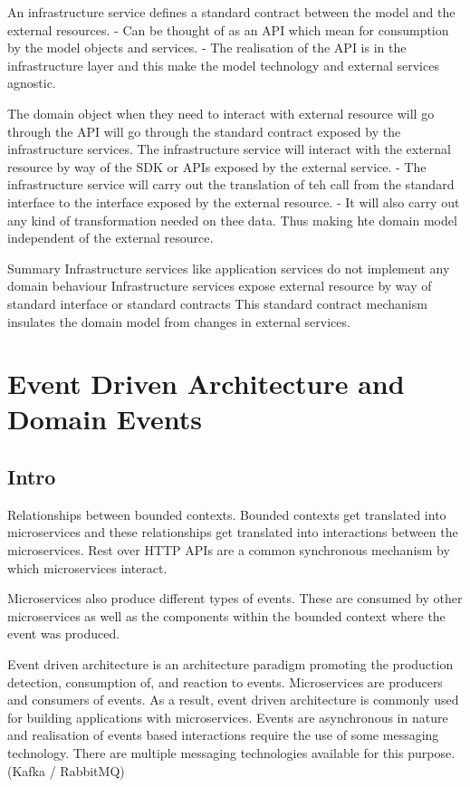 \documentclass[a4paper, 11pt]{book}
\begin{document}
    An infrastructure service defines a standard contract between the model and the external resources.
    - Can be thought of as an API which mean for consumption by the model objects and services.
    - The realisation of the API is in the infrastructure layer and this make the model technology and external services agnostic.

    The domain object when they need to interact with external resource will go through the API will go through the standard contract exposed by the infrastructure services.
    The infrastructure service will interact with the external resource by way of the SDK or APIs exposed by the external service.
    - The infrastructure service will carry out the translation of teh call from the standard interface to the interface exposed by the external resource.
    - It will also carry out any kind of transformation needed on thee data.
    Thus making hte domain model independent of the external resource.

    Summary
    Infrastructure services like application services do not implement any domain behaviour
    Infrastructure services expose external resource by way of standard interface or standard contracts
    This standard contract mechanism insulates the domain model from changes in external services.



    \chapter{Event Driven Architecture and Domain Events}


    \section{Intro}
    Relationships between bounded contexts.
    Bounded contexts get translated into microservices and these relationships get translated into interactions between the microservices.
    Rest over HTTP APIs are a common synchronous mechanism by which microservices interact.

    Microservices also produce different types of events.
    These are consumed by other microservices as well as the components within the bounded context where the event was produced.

    Event driven architecture is an architecture paradigm promoting the production detection, consumption of, and reaction to events.
    Microservices are producers and consumers of events.
    As a result, event driven architecture is commonly used for building applications with microservices.
    Events are asynchronous in nature and realisation of events based interactions require the use of some messaging technology.
    There are multiple messaging technologies available for this purpose. (Kafka / RabbitMQ) %
\end{document}

